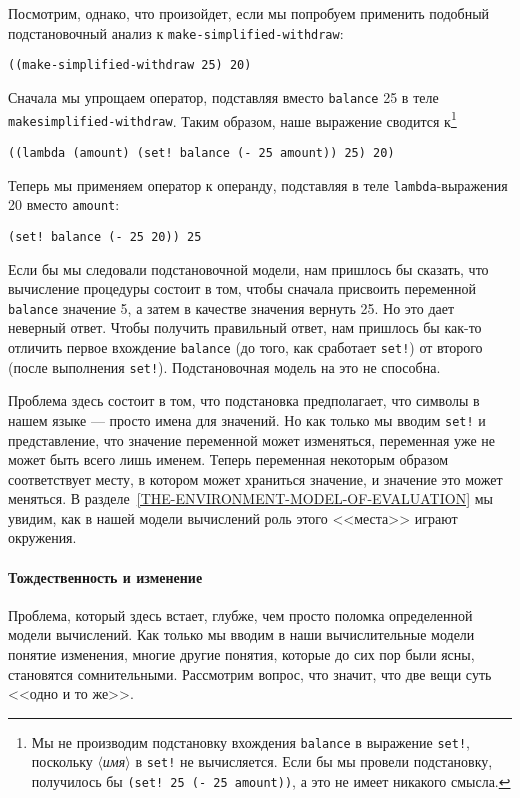 Посмотрим, однако, что произойдет, если мы попробуем
применить подобный подстановочный анализ к
{\tt make-sim\-pli\-fied-withdraw}:
\sloppy

\begin{Verbatim}[fontsize=\small]
((make-simplified-withdraw 25) 20)
\end{Verbatim}
Сначала мы упрощаем оператор, подставляя вместо {\tt balance}
25 в теле {\tt make\-simplified-withdraw}.  Таким образом, наше
выражение сводится к\footnote{Мы не производим подстановку вхождения
{\tt balance} в выражение {\tt set!}, поскольку
\textit{$\langle$имя$\rangle$} в {\tt set!} не вычисляется.  Если бы мы
провели подстановку, получилось бы {\tt (set! 25 (- 25
amount))}, а это не имеет никакого смысла.}

\begin{Verbatim}[fontsize=\small]
((lambda (amount) (set! balance (- 25 amount)) 25) 20)
\end{Verbatim}
Теперь мы применяем оператор к операнду, подставляя в теле
{\tt lambda}-вы\-ра\-же\-ния 20 вместо {\tt amount}:

\begin{Verbatim}[fontsize=\small]
(set! balance (- 25 20)) 25
\end{Verbatim}
Если бы мы следовали подстановочной модели, нам пришлось бы сказать,
что вычисление процедуры состоит в том, чтобы сначала присвоить
переменной {\tt balance} значение 5, а затем в качестве
значения вернуть 25.  Но это дает неверный ответ.  Чтобы получить
правильный ответ, нам пришлось бы как-то отличить первое вхождение
{\tt balance} (до того, как сработает {\tt set!})
от второго (после выполнения {\tt set!}).
Подстановочная модель на это не способна.

Проблема здесь состоит в том, что подстановка предполагает,
что символы в нашем языке --- просто имена для значений.  Но как только
мы вводим {\tt set!} и представление, что значение переменной
может изменяться, переменная уже не может быть всего лишь именем.
Теперь переменная некоторым образом соответствует месту, в котором
может храниться значение, и значение это может меняться.  В
разделе~\ref{THE-ENVIRONMENT-MODEL-OF-EVALUATION} мы
увидим, как в нашей модели вычислений роль этого <<места>> играют
окружения.

\paragraph{Тождественность и изменение}


Проблема,
который здесь встает, глубже, чем просто
поломка определенной модели вычислений.  Как только мы вводим в наши
вычислительные модели понятие изменения, многие другие понятия,
которые до сих пор были ясны, становятся сомнительными.  Рассмотрим
вопрос, что значит, что две вещи суть <<одно и то же>>.

